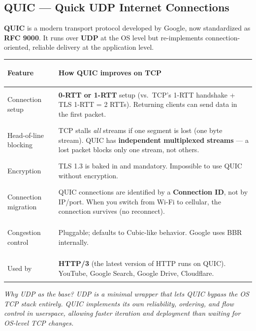 \documentclass[11pt, letterpaper]{article}
\begin{document}
\subsection*{QUIC --- Quick UDP Internet Connections}

\textbf{QUIC} is a modern transport protocol developed by Google, now standardized as
\textbf{RFC 9000}. It runs over \textbf{UDP} at the OS level but re-implements
connection-oriented, reliable delivery at the application level.

\noindent
{\renewcommand{\arraystretch}{1.5}
\begin{tabularx}{\textwidth}{>{\bfseries\raggedright\arraybackslash}p{4cm}
                              >{\raggedright\arraybackslash}X}
\toprule
\rowcolor{tableheaderteal}
\textbf{Feature} & \textbf{How QUIC improves on TCP} \\
\midrule
\rowcolor{rowTe} Connection setup & \textbf{0-RTT or 1-RTT} setup (vs.\ TCP's 1-RTT handshake + TLS 1-RTT = 2 RTTs). Returning clients can send data in the first packet. \\
\rowcolor{rowA}  Head-of-line blocking & TCP stalls \emph{all} streams if one segment is lost (one byte stream). QUIC has \textbf{independent multiplexed streams} --- a lost packet blocks only one stream, not others. \\
\rowcolor{rowTe} Encryption & TLS 1.3 is baked in and mandatory. Impossible to use QUIC without encryption. \\
\rowcolor{rowA}  Connection migration & QUIC connections are identified by a \textbf{Connection ID}, not by IP/port. When you switch from Wi-Fi to cellular, the connection survives (no reconnect). \\
\rowcolor{rowTe} Congestion control & Pluggable; defaults to Cubic-like behavior. Google uses BBR internally. \\
\rowcolor{rowA}  Used by & \textbf{HTTP/3} (the latest version of HTTP runs on QUIC). YouTube, Google Search, Google Drive, Cloudflare. \\
\bottomrule
\end{tabularx}}

\vspace{4pt}
\textit{Why UDP as the base? UDP is a minimal wrapper that lets QUIC bypass the OS TCP
stack entirely. QUIC implements its own reliability, ordering, and flow control in userspace,
allowing faster iteration and deployment than waiting for OS-level TCP changes.}



\newpage
\end{document}
